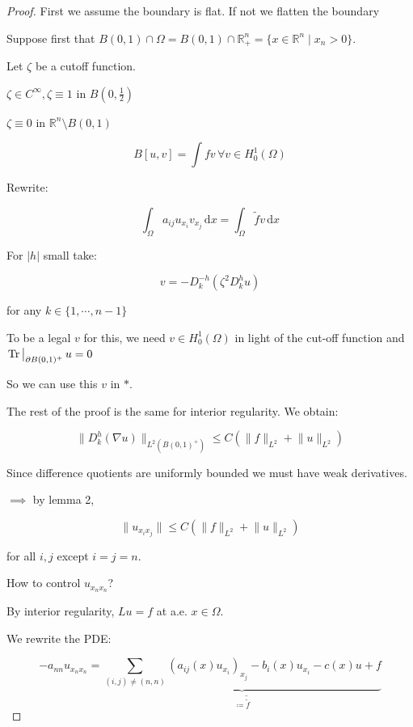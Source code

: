 \documentclass{article}
\theoremstyle{definition}
\begin{document}
\begin{proof}

    First we assume the boundary is flat. If not we flatten the boundary

    Suppose first that \(B(0,1) \cap \Omega = B(0,1) \cap \mathbb{R}^n_+ = \{ x\in \mathbb{R}^n \mid x_n > 0 \}\). 


    Let \(\zeta\) be a cutoff function.

    \(\zeta \in C^{\infty}, \zeta \equiv 1\) in \(B(0,\frac{1}{2})\)

    \(\zeta \equiv 0\) in \(\mathbb{R}^n \setminus B(0,1)\)

    \[
        B[u,v] = \int fv \, \forall v \in H^1_0(\Omega)
    \]

    Rewrite:

    \[
        \int_{\Omega} a_{ij} u_{x_i} v_{x_j} \,\mathrm{d}x = \int_{\Omega} \widetilde{f} v \,\mathrm{d}x 
    \]

    For \(\vert h \vert \) small take:

    \[
        v = - D_k^{-h} (\zeta^2 D_k^h u)
    \]

    for any \(k\in \{ 1, \cdots , n-1 \} \) 

    To be a legal \(v\) for this, we need \(v\in H^1_0(\Omega)\) in light of the cut-off function and \(\eval{\Tr}_{\partial B(0,1)^+} u = 0 \) 

    So we can use this \(v\) in \(\ast\).

    The rest of the proof is the same for interior regularity. We obtain:

    \[
        \lVert D_k^h (\nabla u) \rVert _{L^2(B(0,1)^+)} \leq C \left( \lVert f \rVert _{L^2} + \lVert u \rVert _{L^2} \right) 
    \]

    Since difference quotients are uniformly bounded we must have weak derivatives.

    \(\implies\) by lemma 2,

    \[
        \lVert u_{x_i x_j} \rVert \leq C \left( \lVert f \rVert _{L^2} + \lVert u \rVert _{L^2} \right)
    \]

    for all \(i,j\) except \(i=j=n\).

    How to control \(u_{x_n x_n}\)?

    By interior regularity, \(L u = f\) at a.e. \(x\in \Omega\).

    We rewrite the PDE:

    \[
        - a_{n n} u_{x_n x_n} = \underbrace{\sum_{(i,j) \neq (n,n)} (a_{ij} (x) u_{x_i})_{x_j}  - b_i(x) u_{x_i} - c(x)u + f}_{\coloneqq \tilde{\tilde{f}}}
    \]


\end{proof}
\end{document}
